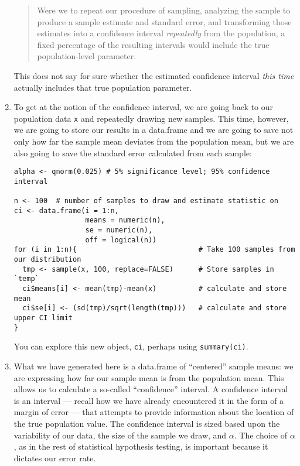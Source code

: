 \documentclass[a4paper,12pt]{article}
\begin{document}
\begin{enumerate}
\begin{quote}
Were we to repeat our procedure of sampling, analyzing the sample to produce a sample estimate and standard error, and transforming those estimates into a confidence interval \textit{repeatedly} from the population, a fixed percentage of the resulting intervals would include the true population-level parameter.
\end{quote}
        
\noindent This does not say for sure whether the estimated confidence interval \textit{this time} actually includes that true population parameter.

\clearpage 

\item To get at the notion of the confidence interval, we are going back to our population data \texttt{x} and repeatedly drawing new samples. This time, however, we are going to store our results in a data.frame and we are going to save not only how far the sample mean deviates from the population mean, but we are also going to save the standard error calculated from each sample:

\begin{verbatim}
alpha <- qnorm(0.025) # 5% significance level; 95% confidence interval

n <- 100  # number of samples to draw and estimate statistic on
ci <- data.frame(i = 1:n,
                 means = numeric(n),
                 se = numeric(n),
                 off = logical(n))
for (i in 1:n){                             # Take 100 samples from our distribution
  tmp <- sample(x, 100, replace=FALSE)      # Store samples in `temp`
  ci$means[i] <- mean(tmp)-mean(x)          # calculate and store mean
  ci$se[i] <- (sd(tmp)/sqrt(length(tmp)))   # calculate and store upper CI limit
}
\end{verbatim}

\noindent You can explore this new object, \texttt{ci}, perhaps using \texttt{summary(ci)}.

\item What we have generated here is a data.frame of ``centered'' sample means: we are expressing how far our sample mean is from the population mean. This allows us to calculate a so-called ``confidence'' interval. A confidence interval is an interval --- recall how we have already encountered it in the form of a margin of error --- that attempts to provide information about the location of the true population value. The confidence interval is sized based upon the variability of our data, the size of the sample we draw, and $\alpha$. The choice of $\alpha$, as in the rest of statistical hypothesis testing, is important because it dictates our error rate. 


\end{enumerate}
\end{document}
